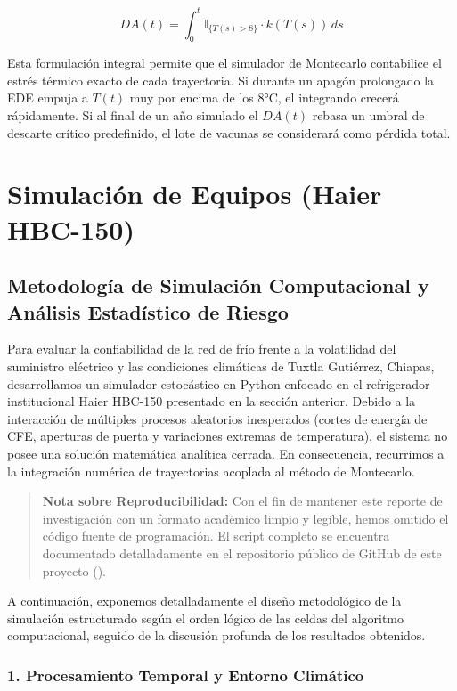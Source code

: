 \documentclass[
  spanish,
  letterpaper,
  DIV=11,
  numbers=noendperiod]{scrreprt}
\theoremstyle{plain}
\theoremstyle{definition}
\theoremstyle{remark}
\begin{document}
\[
DA(t) = \int_{0}^{t} \mathbb{I}_{\{T(s) > 8\}} \cdot k(T(s)) \, ds
\]

Esta formulación integral permite que el simulador de Montecarlo
contabilice el estrés térmico exacto de cada trayectoria. Si durante un
apagón prolongado la EDE empuja a \(T(t)\) muy por encima de los 8°C, el
integrando crecerá rápidamente. Si al final de un año simulado el
\(DA(t)\) rebasa un umbral de descarte crítico predefinido, el lote de
vacunas se considerará como pérdida total.

\part{Simulación de Equipos (Haier HBC-150)}

\chapter{Metodología de Simulación Computacional y Análisis Estadístico
de
Riesgo}\label{metodologuxeda-de-simulaciuxf3n-computacional-y-anuxe1lisis-estaduxedstico-de-riesgo}

Para evaluar la confiabilidad de la red de frío frente a la volatilidad
del suministro eléctrico y las condiciones climáticas de Tuxtla
Gutiérrez, Chiapas, desarrollamos un simulador estocástico en Python
enfocado en el refrigerador institucional Haier HBC-150 presentado en la
sección anterior. Debido a la interacción de múltiples procesos
aleatorios inesperados (cortes de energía de CFE, aperturas de puerta y
variaciones extremas de temperatura), el sistema no posee una solución
matemática analítica cerrada. En consecuencia, recurrimos a la
integración numérica de trayectorias acoplada al método de Montecarlo.

\begin{quote}
\textbf{Nota sobre Reproducibilidad:} Con el fin de mantener este
reporte de investigación con un formato académico limpio y legible,
hemos omitido el código fuente de programación. El script completo se
encuentra documentado detalladamente en el repositorio público de GitHub
de este proyecto ().
\end{quote}

A continuación, exponemos detalladamente el diseño metodológico de la
simulación estructurado según el orden lógico de las celdas del
algoritmo computacional, seguido de la discusión profunda de los
resultados obtenidos.

\section{1. Procesamiento Temporal y Entorno
Climático}\label{procesamiento-temporal-y-entorno-climuxe1tico}
\end{document}
